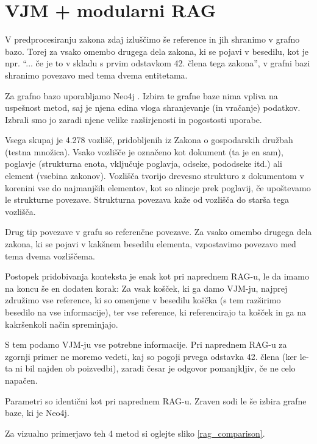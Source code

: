 \documentclass[a4paper,12pt,openright]{book}
\begin{document}
\section{VJM + modularni RAG}
\label{llm_kg_rag}

V predprocesiranju zakona zdaj izluščimo še reference in jih shranimo v grafno bazo. Torej za vsako omembo drugega dela zakona, ki se pojavi v besedilu, kot je npr. “... če je to v skladu s prvim odstavkom 42. člena tega zakona”, v grafni bazi shranimo povezavo med tema dvema entitetama.

Za grafno bazo uporabljamo Neo4j \cite{neo4j}. Izbira te grafne baze nima vpliva na uspešnost metod, saj je njena edina vloga shranjevanje (in vračanje) podatkov. Izbrali smo jo zaradi njene velike razširjenosti in pogostosti uporabe.

Vsega skupaj je 4.278 vozlišč, pridobljenih iz Zakona o gospodarskih družbah (testna množica). Vsako vozlišče je označeno kot dokument (ta je en sam), poglavje (strukturna enota, vključuje poglavja, odseke, pododseke itd.) ali element (vsebina zakonov). Vozlišča tvorijo drevesno strukturo z dokumentom v korenini vse do najmanjših elementov, kot so alineje prek poglavij, če upoštevamo le strukturne povezave. Strukturna povezava kaže od vozlišča do starša tega vozlišča.

Drug tip povezave v grafu so referenčne povezave. Za vsako omembo drugega dela zakona, ki se pojavi v kakšnem besedilu elementa, vzpostavimo povezavo med tema dvema vozliščema.

Postopek pridobivanja konteksta je enak kot pri naprednem RAG-u, le da imamo na koncu še en dodaten korak: Za vsak košček, ki ga damo VJM-ju, najprej združimo vse reference, ki so omenjene v besedilu koščka (s tem razširimo besedilo na vse informacije), ter vse reference, ki referencirajo ta košček in ga na kakršenkoli način spreminjajo.

S tem podamo VJM-ju vse potrebne informacije. Pri naprednem RAG-u za zgornji primer ne moremo vedeti, kaj so pogoji prvega odstavka 42. člena (ker le-ta ni bil najden ob poizvedbi), zaradi česar je odgovor pomanjkljiv, če ne celo napačen.

Parametri so identični kot pri naprednem RAG-u. Zraven sodi le še izbira grafne baze, ki je Neo4j.

Za vizualno primerjavo teh 4 metod si oglejte sliko \ref{rag_comparison}.
\end{document}

